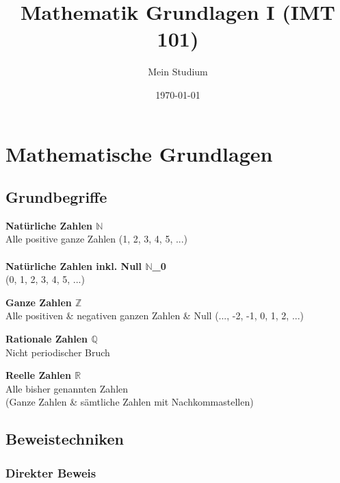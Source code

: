 \documentclass[a4paper,10pt]{article}
\begin{document}
\title{Mathematik Grundlagen I (IMT 101)}
\author{Mein Studium}
\date{\today}
\maketitle


\section{Mathematische Grundlagen}

\subsection{Grundbegriffe}


\begin{definitionbox}
\textbf{Natürliche Zahlen $\mathbb{N}$} \\
Alle positive ganze Zahlen (1, 2, 3, 4, 5, ...)  \\
\\
\textbf{Natürliche Zahlen inkl. Null $\mathbb{N}$_0} \\
(0, 1, 2, 3, 4, 5, ...)
\end{definitionbox}



\begin{definitionbox}
\textbf{Ganze Zahlen $\mathbb{Z}$} \\
Alle positiven \& negativen ganzen Zahlen \& Null (..., -2, -1, 0, 1, 2, ...)
\end{definitionbox}


\begin{definitionbox}
\textbf{Rationale Zahlen $\mathbb{Q}$} \\
Nicht periodischer Bruch
\end{definitionbox}


\begin{definitionbox}
\textbf{Reelle Zahlen $\mathbb{R}$} \\
Alle bisher genannten Zahlen \\
(Ganze Zahlen \& sämtliche Zahlen mit Nachkommastellen)
\end{definitionbox}


\subsection{Beweistechniken}
\subsubsection{Direkter Beweis}
\end{document}
